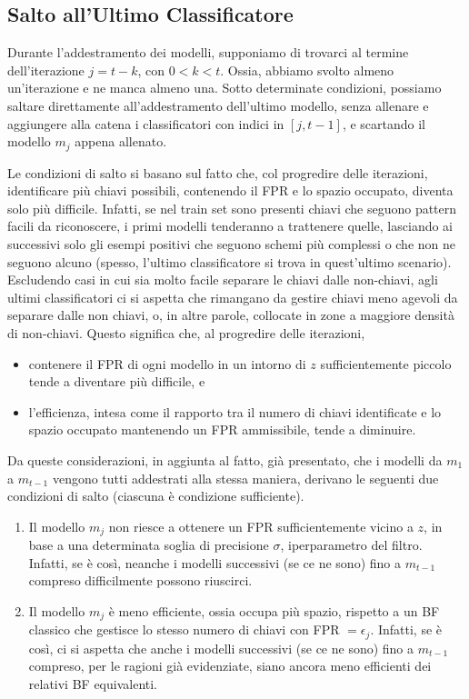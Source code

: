 \subsection{Salto all'Ultimo Classificatore}

Durante l'addestramento dei modelli, supponiamo di trovarci al termine dell'iterazione $j = t - k$, con $0<k<t$. Ossia, abbiamo svolto almeno un'iterazione e ne manca almeno una. Sotto determinate condizioni, possiamo saltare direttamente all'addestramento dell'ultimo modello, senza allenare e aggiungere alla catena i classificatori con indici in $[j,t-1]$, e scartando il modello $m_j$ appena allenato.

Le condizioni di salto si basano sul fatto che, col progredire delle iterazioni, identificare più chiavi possibili, contenendo il FPR e lo spazio occupato, diventa solo più difficile. Infatti, se nel train set sono presenti chiavi che seguono pattern facili da riconoscere, i primi modelli tenderanno a trattenere quelle, lasciando ai successivi solo gli esempi positivi che seguono schemi più complessi o che non ne seguono alcuno (spesso, l'ultimo classificatore si trova in quest'ultimo scenario). Escludendo casi in cui sia molto facile separare le chiavi dalle non-chiavi, agli ultimi classificatori ci si aspetta che rimangano da gestire chiavi meno agevoli da separare dalle non chiavi, o, in altre parole, collocate in zone a maggiore densità di non-chiavi.
Questo significa che, al progredire delle iterazioni,
\begin{itemize}
    \item contenere il FPR di ogni modello in un intorno di $z$ sufficientemente piccolo tende a diventare più difficile, e
    \item l'efficienza, intesa come il rapporto tra il numero di chiavi identificate e lo spazio occupato mantenendo un FPR  ammissibile, tende a diminuire.
\end{itemize}
Da queste considerazioni, in aggiunta al fatto, già presentato, che i modelli da $m_1$ a $m_{t-1}$ vengono tutti addestrati alla stessa maniera, derivano le seguenti due condizioni di salto (ciascuna è condizione sufficiente).
\begin{enumerate}
    \item Il modello $m_j$ non riesce a ottenere un FPR sufficientemente vicino a $z$, in base a una determinata soglia di precisione $\sigma$, iperparametro del filtro. Infatti, se è così, neanche i modelli successivi (se ce ne sono) fino a $m_{t-1}$ compreso difficilmente possono riuscirci.

    \item Il modello $m_j$ è meno efficiente, ossia occupa più spazio, rispetto a un BF classico che gestisce lo stesso numero di chiavi con FPR $= \epsilon_j$. Infatti, se è così, ci si aspetta che anche i modelli successivi (se ce ne sono) fino a $m_{t-1}$ compreso, per le ragioni già evidenziate, siano ancora meno efficienti dei relativi BF equivalenti. 
\end{enumerate}
